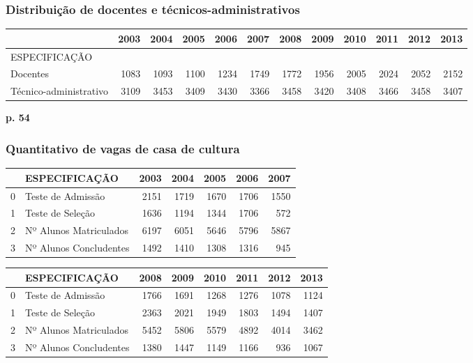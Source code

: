 \documentclass{article}
\begin{document}
\subsubsection*{Distribuição de docentes e técnicos-administrativos}

\begin{tabular}{lrrrrrrrrrrr}
\toprule
{} &  2003 &  2004 &  2005 &  2006 &  2007 &  2008 &  2009 &  2010 &  2011 &  2012 &  2013 \\
\midrule
ESPECIFICAÇÃO          &       &       &       &       &       &       &       &       &       &       &       \\
Docentes               &  1083 &  1093 &  1100 &  1234 &  1749 &  1772 &  1956 &  2005 &  2024 &  2052 &  2152 \\
Técnico-administrativo &  3109 &  3453 &  3409 &  3430 &  3366 &  3458 &  3420 &  3408 &  3466 &  3458 &  3407 \\
\bottomrule
\end{tabular}
\textbf{p. 54}

\subsubsection*{Quantitativo de vagas de casa de cultura}
\begin{tabular}{llrrrrr}
\toprule
{} &           ESPECIFICAÇÃO &  2003 &  2004 &  2005 &  2006 &  2007 \\
\midrule
0 &       Teste de Admissão &  2151 &  1719 &  1670 &  1706 &  1550 \\
1 &        Teste de Seleção &  1636 &  1194 &  1344 &  1706 &   572 \\
2 &  Nº Alunos Matriculados &  6197 &  6051 &  5646 &  5796 &  5867 \\
3 &  Nº Alunos Concludentes &  1492 &  1410 &  1308 &  1316 &   945 \\
\bottomrule
\end{tabular}

\begin{tabular}{llrrrrrr}
\toprule
{} &           ESPECIFICAÇÃO &  2008 &  2009 &  2010 &  2011 &  2012 &  2013 \\
\midrule
0 &       Teste de Admissão &  1766 &  1691 &  1268 &  1276 &  1078 &  1124 \\
1 &        Teste de Seleção &  2363 &  2021 &  1949 &  1803 &  1494 &  1407 \\
2 &  Nº Alunos Matriculados &  5452 &  5806 &  5579 &  4892 &  4014 &  3462 \\
3 &  Nº Alunos Concludentes &  1380 &  1447 &  1149 &  1166 &   936 &  1067 \\
\bottomrule
\end{tabular}
\end{document}

